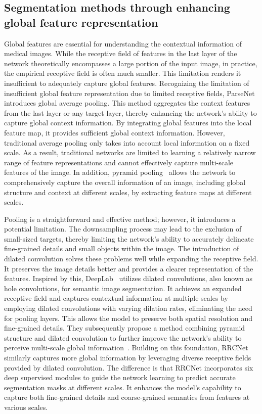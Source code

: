 \documentclass[review]{elsarticle}
\begin{document}
	\subsection{Segmentation methods through enhancing global feature representation}
	Global features are essential for understanding the contextual information of medical images. While the receptive field of features in the last layer of the network theoretically encompasses a large portion of the input image, in practice, the empirical receptive field is often much smaller. This limitation renders it insufficient to adequately capture global features. Recognizing the limitation of insufficient global feature representation due to limited receptive fields, ParseNet~\cite{liu2016parsenet} introduces global average pooling. This method aggregates the context features from the last layer or any target layer, thereby enhancing the network's ability to capture global context information. By integrating global features into the local feature map, it provides sufficient global context information. However, traditional average pooling only takes into account local information on a fixed scale. As a result, traditional networks are limited to learning a relatively narrow range of feature representations and cannot effectively capture multi-scale features of the image. In addition, pyramid pooling~\cite{zhao2017pyramid} allows the network to comprehensively capture the overall information of an image, including global structure and context at different scales, by extracting feature maps at different scales. 
	
	Pooling is a straightforward and effective method; however, it introduces a potential limitation. The downsampling process may lead to the exclusion of small-sized targets, thereby limiting the network's ability to accurately delineate fine-grained details and small objects within the image. The introduction of dilated convolution solves these problems well while expanding the receptive field. It preserves the image details better and provides a clearer representation of the features. Inspired by this, DeepLab~\cite{chen2017deeplab} utilizes dilated convolutions, also known as hole convolutions, for semantic image segmentation. It achieves an expanded receptive field and captures contextual information at multiple scales by employing dilated convolutions with varying dilation rates, eliminating the need for pooling layers. This allows the model to preserve both spatial resolution and fine-grained details. They subsequently propose a method combining pyramid structure and dilated convolution to further improve the network's ability to perceive multi-scale global information~\cite{chen2018encoder}. Building on this foundation, RRCNet~\cite{chen2023rrcnet} similarly captures more global information by leveraging diverse receptive fields provided by dilated convolution. The difference is that RRCNet incorporates six deep supervised modules to guide the network learning to predict accurate segmentation masks at different scales. It enhances the model's capability to capture both fine-grained details and coarse-grained semantics from features at various scales.
	
\end{document}
